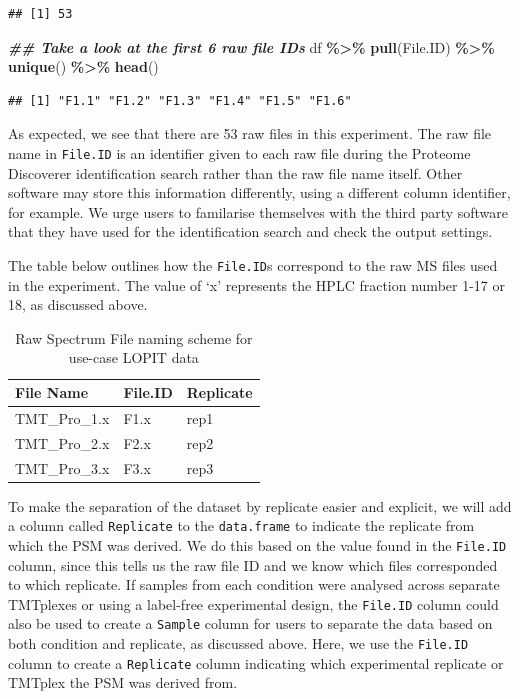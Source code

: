\documentclass[9pt,a4paper,]{extarticle}
\newenvironment{Shaded}{\begin{snugshade}}{\end{snugshade}}
\newcommand{\DocumentationTok}[1]{\textcolor[rgb]{0.56,0.35,0.01}{\textbf{\textit{#1}}}}
\newcommand{\FunctionTok}[1]{\textcolor[rgb]{0.13,0.29,0.53}{\textbf{#1}}}
\newcommand{\NormalTok}[1]{#1}
\newcommand{\SpecialCharTok}[1]{\textcolor[rgb]{0.81,0.36,0.00}{\textbf{#1}}}
\begin{document}
\begin{verbatim}
## [1] 53
\end{verbatim}

\begin{Shaded}
\begin{Highlighting}[]
\DocumentationTok{\#\# Take a look at the first 6 raw file IDs}
\NormalTok{df }\SpecialCharTok{\%\textgreater{}\%}
  \FunctionTok{pull}\NormalTok{(File.ID) }\SpecialCharTok{\%\textgreater{}\%}
  \FunctionTok{unique}\NormalTok{() }\SpecialCharTok{\%\textgreater{}\%}
  \FunctionTok{head}\NormalTok{()}
\end{Highlighting}
\end{Shaded}

\begin{verbatim}
## [1] "F1.1" "F1.2" "F1.3" "F1.4" "F1.5" "F1.6"
\end{verbatim}

As expected, we see that there are 53 raw files in this experiment. The raw file
name in \texttt{File.ID} is an identifier given to each raw file during the Proteome
Discoverer identification search rather than the raw file name itself. Other
software may store this information differently, using a different column identifier,
for example. We urge users to familarise themselves with the third party software
that they have used for the identification search and check the output settings.

The table below outlines how the \texttt{File.ID}s correspond to the raw MS files used
in the experiment. The value of `x' represents the HPLC fraction number 1-17 or
18, as discussed above.

\begin{table}[H]
\centering
\caption{\label{tab:samplestable}Raw Spectrum File naming scheme for use-case LOPIT data}
\centering
\begin{tabular}[t]{l|l|l}
\hline
File Name & File.ID & Replicate\\
\hline
TMT\_Pro\_1.x & F1.x & rep1\\
\hline
TMT\_Pro\_2.x & F2.x & rep2\\
\hline
TMT\_Pro\_3.x & F3.x & rep3\\
\hline
\end{tabular}
\end{table}

To make the separation of the dataset by replicate easier and explicit, we will
add a column called \texttt{Replicate} to the \texttt{data.frame} to indicate the replicate
from which the PSM was derived. We do this based on the value found in the
\texttt{File.ID} column, since this tells us the raw file ID and we know which files
corresponded to which replicate. If samples from each condition were analysed
across separate TMTplexes or using a label-free experimental design, the \texttt{File.ID}
column could also be used to create a \texttt{Sample} column for users to separate the
data based on both condition and replicate, as discussed above. Here, we use
the \texttt{File.ID} column to create a \texttt{Replicate} column indicating which experimental
replicate or TMTplex the PSM was derived from.
\end{document}
